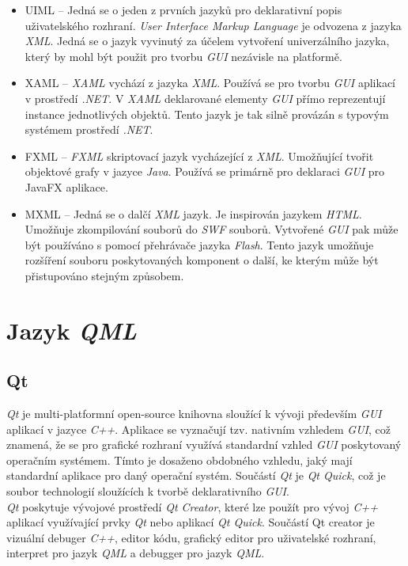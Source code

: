 \documentclass[11pt,twoside,a4paper]{book}
\begin{document}
\begin{itemize}
\item UIML – Jedná se o jeden z prvních jazyků pro deklarativní popis uživatelského rozhraní. \textit{User Interface Markup Language} je odvozena z jazyka \textit{XML}. Jedná se o jazyk vyvinutý za účelem vytvoření univerzálního jazyka, který by mohl být použit pro tvorbu \textit{GUI} nezávisle na platformě. \cite{bib:UIML}
\item XAML – \textit{XAML} vychází z jazyka \textit{XML}. Používá se pro tvorbu \textit{GUI} aplikací v prostředí \textit{.NET}. V \textit{XAML} deklarované elementy \textit{GUI} přímo reprezentují instance jednotlivých objektů. Tento jazyk je tak silně provázán s typovým systémem prostředí \textit{.NET}. \cite{bib:XAML}
\item FXML – \textit{FXML} skriptovací jazyk vycházející z \textit{XML}. Umožňující tvořit objektové grafy v jazyce \textit{Java}. Používá se primárně pro deklaraci \textit{GUI} pro JavaFX aplikace.\cite{bib:FXML}
\item MXML – Jedná se o dalčí \textit{XML} jazyk. Je inspirován jazykem \textit{HTML}. Umožňuje zkompilování souborů do \textit{SWF} souborů. Vytvořené \textit{GUI} pak může být používáno s pomocí přehrávače jazyka \textit{Flash}. Tento jazyk umožňuje rozšíření souboru poskytovaných komponent o další, ke kterým může být přistupováno stejným způsobem.\cite{bib:MXML}
\end{itemize}


\section{\label{SEC:QML}Jazyk \textit{QML}}
\subsection{Qt}
\textit{Qt} je multi-platformní open-source knihovna sloužící k vývoji především \textit{GUI} aplikací v jazyce \textit{C++}. Aplikace se vyznačují tzv. nativním vzhledem \textit{GUI}, což znamená, že se pro grafické rozhraní využívá standardní vzhled \textit{GUI} poskytovaný operačním systémem. Tímto je dosaženo obdobného vzhledu, jaký mají standardní aplikace pro daný operační systém. Součástí \textit{Qt} je \textit{Qt Quick}, což je soubor technologií sloužících k tvorbě deklarativního \textit{GUI}.\\
\textit{Qt} poskytuje vývojové prostředí \textit{Qt Creator}, které lze použít pro vývoj \textit{C++} aplikací využívající prvky \textit{Qt} nebo aplikací \textit{Qt Quick}. Součástí Qt creator je vizuální debuger \textit{C++}, editor kódu, grafický editor pro uživatelské rozhraní, interpret pro jazyk \textit{QML} a debugger pro jazyk \textit{QML}.
\end{document}
